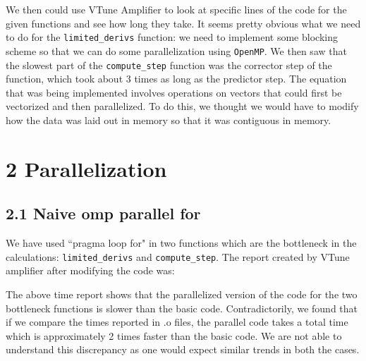 \documentclass[11pt]{article}
\begin{document}
        We then could use VTune Amplifier to look at specific lines of the code for the given functions and see how long they take. It seems pretty obvious what we need to do for the \texttt{limited\_derivs} function: we need to implement some blocking scheme so that we can do some parallelization using \texttt{OpenMP}. We then saw that the slowest part of the \texttt{compute\_step} function was the corrector step of the function, which took about 3 times as long as the predictor step. The equation that was being implemented involves operations on vectors that could first be vectorized and then parallelized. To do this, we thought we would have to modify how the data was laid out in memory so that it was contiguous in memory.
        
    \section{2 Parallelization}

    \subsection{2.1 Naive omp parallel for}
        We have used  ``pragma loop for" in two functions which are the bottleneck in the calculations: \texttt{limited\_derivs} and \texttt{compute\_step}. The report created by VTune amplifier after modifying the code was:
        
        The above time report shows that the parallelized version of the code for the two bottleneck functions is slower than the basic code. Contradictorily, we found that if we compare the times reported in .o files, the parallel code takes a total time which is approximately 2 times faster than the basic code. We are not able to understand this discrepancy as one would expect similar trends in both the cases.
\end{document}

